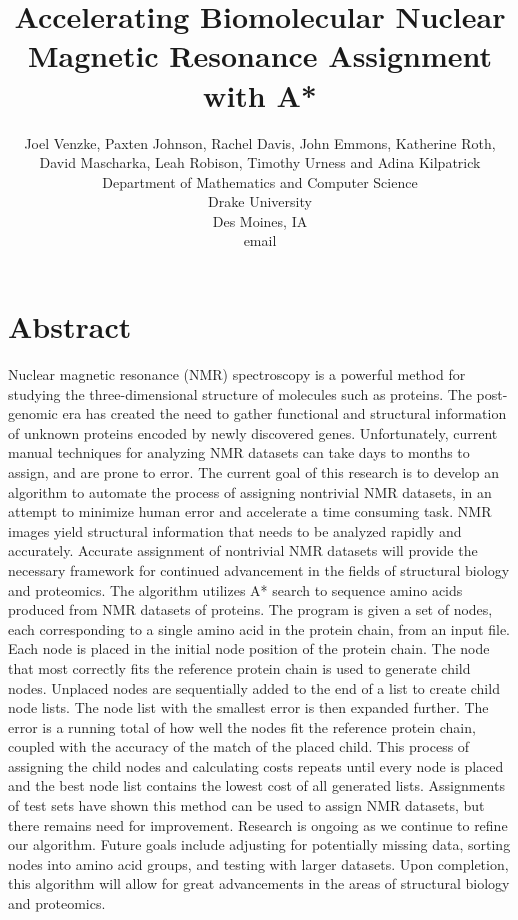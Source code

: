 \documentclass[12pt]{article}
\begin{document}
\pagestyle{plain}

\title{Accelerating Biomolecular Nuclear Magnetic Resonance Assignment with A*}

\author{
Joel Venzke, Paxten Johnson, Rachel Davis, John Emmons, Katherine Roth,\\ David Mascharka, Leah Robison, Timothy Urness and Adina Kilpatrick\\
Department of Mathematics and Computer Science\\
Drake University\\
Des Moines, IA\\
email %
}
\date{} 

\maketitle
\thispagestyle{empty}

\section*{\centering Abstract}

Nuclear magnetic resonance (NMR) spectroscopy is a powerful method for studying the three-dimensional structure of molecules such as proteins. The post-genomic era has created the need to gather functional and structural information of unknown proteins encoded by newly discovered genes. Unfortunately, current manual techniques for analyzing NMR datasets can take days to months to assign, and are prone to error. The current goal of this research is to develop an algorithm to automate the process of assigning nontrivial NMR datasets, in an attempt to minimize human error and accelerate a time consuming task.
%
NMR images yield structural information that needs to be analyzed rapidly and accurately. Accurate assignment of nontrivial NMR datasets will provide the necessary framework for continued advancement in the fields of structural biology and proteomics. 
%
The algorithm utilizes A* search to sequence amino acids produced from NMR datasets of proteins. The program is given a set of nodes, each corresponding to a single amino acid in the protein chain, from an input file. Each node is placed in the initial node position of the protein chain. The node that most correctly fits the reference protein chain is used to generate child nodes. Unplaced nodes are sequentially added to the end of a list to create child node lists. The node list with the smallest error is then expanded further. The error is a running total of how well the nodes fit the reference protein chain, coupled with the accuracy of the match of the placed child. This process of assigning the child nodes and calculating costs repeats until every node is placed and the best node list contains the lowest cost of all generated lists. 
%
Assignments of test sets have shown this method can be used to assign NMR datasets, but there remains need for improvement. Research is ongoing as we continue to refine our algorithm. Future goals include adjusting for potentially missing data, sorting nodes into amino acid groups, and testing with larger datasets. Upon completion, this algorithm will allow for great advancements in the areas of structural biology and proteomics. 
\newpage
\setcounter{page}{1}
\end{document}
